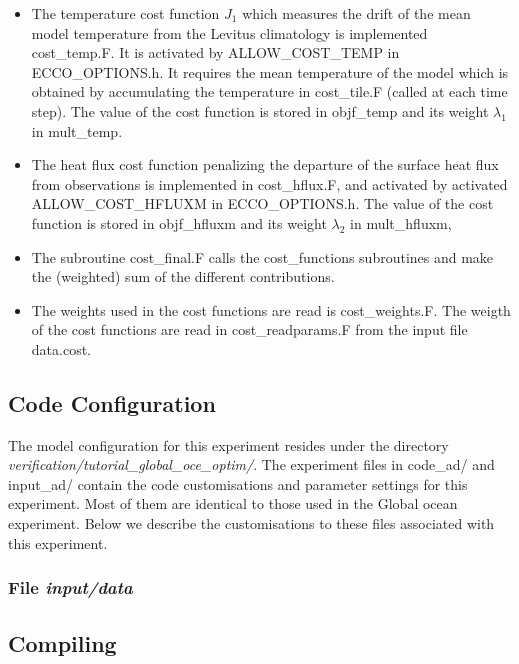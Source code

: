 \begin{itemize}

\item The temperature cost function $J_1$ which measures the drift of the mean model
temperature from the Levitus climatology is implemented cost\_temp.F. It is
activated by ALLOW\_COST\_TEMP in ECCO\_OPTIONS.h. It requires the mean temperature of
the model which is obtained by accumulating the temperature in cost\_tile.F (called at
each time step).
The value of the cost function is stored in objf\_temp and its weight $\lambda_1$
in mult\_temp.

\item The heat flux cost function penalizing the departure of the surface heat flux from
observations is implemented in cost\_hflux.F, and activated by activated
ALLOW\_COST\_HFLUXM in ECCO\_OPTIONS.h. The value of the cost function is stored in
objf\_hfluxm and its weight $\lambda_2$ in mult\_hfluxm,

\item The subroutine cost\_final.F calls the cost\_functions subroutines
and make the (weighted) sum of the different contributions.

\item The weights used in the cost functions are read is cost\_weights.F.
The weigth of the cost functions are read in cost\_readparams.F from the input file
data.cost.    

\end{itemize}


\subsection{Code Configuration}
\label{www:tutorials}
\label{SEC:eg_fourl_code_config}

The model configuration for this experiment resides under the
directory {\it verification/tutorial\_global\_oce\_optim/}.  The experiment files in code\_ad/
and input\_ad/ contain the code customisations and parameter settings
for this experiment. Most of them are identical to those used in
the Global ocean experiment. Below we describe the customisations to
these files associated with this experiment.

\subsubsection{File {\it input/data}}


\subsection{Compiling} 

